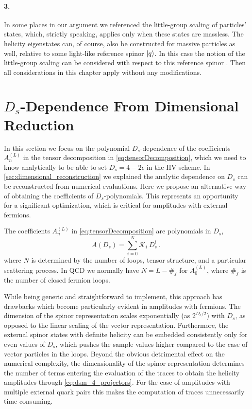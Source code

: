 \paragraph{3.}
In some places in our argument we referenced the little-group scaling 
of particles' states, which, strictly speaking, applies only when these states
are massless.
The helicity eigenstates can, of course, also be constructed for
massive particles as well, relative to some light-like reference spinor $\ket{q}$.
In this case the notion of the little-group scaling can be considered with respect
to this reference spinor \cite{Cohen:2010mi}.
Then all considerations in this chapter apply without any modifications.

 

\section{$D_s$-Dependence From Dimensional Reduction}
\label{sec:ds_reduction}

In this section we focus on the polynomial $D_s$-dependence of 
the coefficients $A^{(L)}_n$ in the tensor decomposition in \cref{eq:tensorDecomposition},
which we need to know analytically to be able to set $D_s=4-2\epsilon$ in the HV scheme.
In \cref{sec:dimensional_reconstruction} we explained the analytic dependence on $D_s$ 
can be reconstructed from numerical evaluations.
Here we propose an alternative way of obtaining the coefficients of $D_s$-polynomials.
This represents an opportunity for a significant optimization, 
which is critical for amplitudes with external fermions.

The coefficients $A^{(L)}_n$ in \cref{eq:tensorDecomposition} are polynomials in $D_s$,
\begin{equation}
  A(D_s) = \sum_{i=0}^{N} \mathcal{K}_i~D_s^{i}\ .
  \label{eq:ds-poly}
\end{equation}
where $N$ is determined by the number of loops, tensor structure,
and a particular scattering process. 
In QCD we normally have $N=L - \#_f$ for $A^{(L)}_0$, 
where $\#_f$ is the number of closed fermion loops.

While being generic and straightforward to implement, this approach has drawbacks which
become particularly evident in amplitudes with fermions.
%
The dimension of the spinor representation scales exponentially (as $2^{D_s/2}$) with $D_s$,
as opposed to the linear scaling of the vector representation.
Furthermore, the external spinor states with definite helicity can be embedded consistently
only for even values of $D_s$,
which pushes the sample values higher compared to the case of vector particles in the loops.
Beyond the obvious detrimental effect on the numerical complexity, the dimensionality of the
spinor representation determines the number of terms entering the evaluation of the traces
to obtain the helicity amplitudes through  \cref{eq:dsm_4_projectors}. For
the case of amplitudes with multiple external quark pairs this makes the computation
of traces unnecessarily time consuming.

